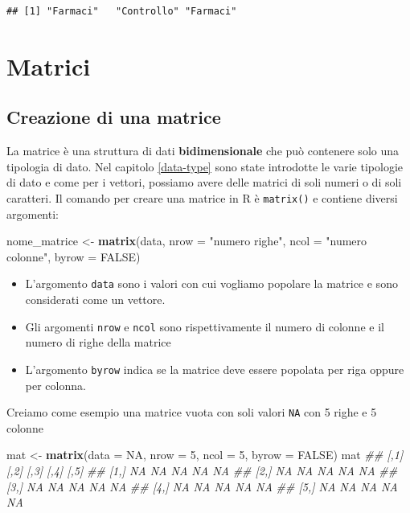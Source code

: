 \documentclass[
]{book}
\newenvironment{Shaded}{\begin{snugshade}}{\end{snugshade}}
\newcommand{\CommentTok}[1]{\textcolor[rgb]{0.56,0.35,0.01}{\textit{#1}}}
\newcommand{\DataTypeTok}[1]{\textcolor[rgb]{0.13,0.29,0.53}{#1}}
\newcommand{\DecValTok}[1]{\textcolor[rgb]{0.00,0.00,0.81}{#1}}
\newcommand{\KeywordTok}[1]{\textcolor[rgb]{0.13,0.29,0.53}{\textbf{#1}}}
\newcommand{\NormalTok}[1]{#1}
\newcommand{\OtherTok}[1]{\textcolor[rgb]{0.56,0.35,0.01}{#1}}
\newcommand{\StringTok}[1]{\textcolor[rgb]{0.31,0.60,0.02}{#1}}
\providecommand{\tightlist}{%
  \setlength{\itemsep}{0pt}\setlength{\parskip}{0pt}}
\begin{document}
\begin{verbatim}
## [1] "Farmaci"   "Controllo" "Farmaci"
\end{verbatim}

\hypertarget{matrix}{%
\chapter{Matrici}\label{matrix}}

\hypertarget{creazione-di-una-matrice}{%
\section{Creazione di una matrice}\label{creazione-di-una-matrice}}

La matrice è una struttura di dati \textbf{bidimensionale} che può contenere solo una tipologia di dato. Nel capitolo \ref{data-type} sono state introdotte le varie tipologie di dato e come per i vettori, possiamo avere delle matrici di soli numeri o di soli caratteri. Il comando per creare una matrice in R è \texttt{matrix()} e contiene diversi argomenti:

\begin{Shaded}
\begin{Highlighting}[]
\NormalTok{nome_matrice <-}\StringTok{ }\KeywordTok{matrix}\NormalTok{(data, }\DataTypeTok{nrow =} \StringTok{"numero righe"}\NormalTok{, }\DataTypeTok{ncol =} \StringTok{"numero colonne"}\NormalTok{, }\DataTypeTok{byrow =} \OtherTok{FALSE}\NormalTok{)}
\end{Highlighting}
\end{Shaded}

\begin{itemize}
\tightlist
\item
  L'argomento \texttt{data} sono i valori con cui vogliamo popolare la matrice e sono considerati come un vettore.
\item
  Gli argomenti \texttt{nrow} e \texttt{ncol} sono rispettivamente il numero di colonne e il numero di righe della matrice
\item
  L'argomento \texttt{byrow} indica se la matrice deve essere popolata per riga oppure per colonna.
\end{itemize}

Creiamo come esempio una matrice vuota con soli valori \texttt{NA} con 5 righe e 5 colonne

\begin{Shaded}
\begin{Highlighting}[]
\NormalTok{mat <-}\StringTok{ }\KeywordTok{matrix}\NormalTok{(}\DataTypeTok{data =} \OtherTok{NA}\NormalTok{, }\DataTypeTok{nrow =} \DecValTok{5}\NormalTok{, }\DataTypeTok{ncol =} \DecValTok{5}\NormalTok{, }\DataTypeTok{byrow =} \OtherTok{FALSE}\NormalTok{)}
\NormalTok{mat}
\CommentTok{##      [,1] [,2] [,3] [,4] [,5]}
\CommentTok{## [1,]   NA   NA   NA   NA   NA}
\CommentTok{## [2,]   NA   NA   NA   NA   NA}
\CommentTok{## [3,]   NA   NA   NA   NA   NA}
\CommentTok{## [4,]   NA   NA   NA   NA   NA}
\CommentTok{## [5,]   NA   NA   NA   NA   NA}
\end{Highlighting}
\end{Shaded}
\end{document}
